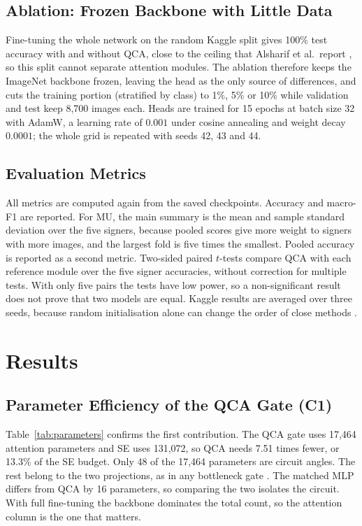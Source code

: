 \documentclass[10pt,twocolumn]{article}
\newcommand{\QCA}{QCA}
\begin{document}
\subsection{Ablation: Frozen Backbone with Little Data}
\label{sec:ablation}

Fine-tuning the whole network on the random Kaggle split gives 100\% test accuracy
with and without \QCA{}, close to the ceiling that Alsharif et al.\ report
\citep{alsharif_2023_asl}, so this split cannot separate attention modules.
The ablation therefore keeps the ImageNet backbone frozen, leaving the head
as the only source of differences, and cuts the training portion
(stratified by class) to 1\%, 5\% or 10\% while validation and test keep
8,700 images each. Heads are trained for 15 epochs at batch size 32 with
AdamW, a learning rate of $0.001$ under cosine annealing and weight decay
$0.0001$; the whole grid is repeated with seeds 42, 43 and 44.

\subsection{Evaluation Metrics}

All metrics are computed again from the saved checkpoints. Accuracy and
macro-F1 are reported. For MU, the main summary is the mean and sample
standard deviation over the five signers, because pooled scores give more
weight to signers with more images, and the largest fold is five times the
smallest. Pooled accuracy is reported as a second metric. Two-sided paired
$t$-tests compare \QCA{} with each reference module over the five signer
accuracies, without correction for multiple tests. With only five pairs the
tests have low power, so a non-significant result does not prove that two
models are equal. Kaggle results are averaged over three seeds, because
random initialisation alone can change the order of close methods
\citep{bouthillier_2021_variance}.

\section{Results}
\label{sec:results}

\subsection{Parameter Efficiency of the QCA Gate (C1)}
\label{sec:res-params}

Table~\ref{tab:parameters} confirms the first contribution. The \QCA{} gate
uses 17,464 attention parameters and SE uses 131,072, so \QCA{} needs 7.51
times fewer, or 13.3\% of the SE budget. Only 48 of the 17,464 parameters
are circuit angles. The rest belong to the two projections, as in any
bottleneck gate \citep{hu_2020_se,wang_2020_eca}. The matched MLP differs from
\QCA{} by 16 parameters, so comparing the two isolates the circuit. With full
fine-tuning the backbone dominates the total count, so the attention column
is the one that matters.
\end{document}
